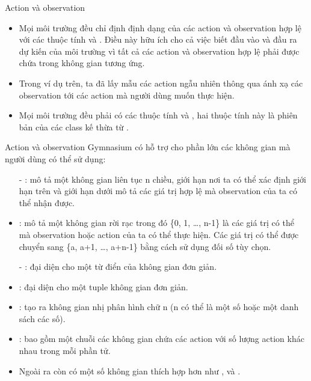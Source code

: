 \documentclass[10pt,aspectratio=169]{beamer}
\begin{document}
\begin{frame}{Action và observation}{\subsecname}
\begin{itemize}
\setlength\itemsep{8pt}
\item Mọi môi trường đều chỉ định định dạng của các action và observation hợp lệ với các thuộc tính  và . Điều này hữu ích cho cả việc biết đầu vào và đầu ra dự kiến của môi trường vì tất cả các action và observation hợp lệ phải được chứa trong không gian tương ứng.
\item Trong ví dụ trên, ta đã lấy mẫu các action ngẫu nhiên thông qua  ánh xạ các observation tới các action mà người dùng muốn thực hiện. 
\item Mọi môi trường đều phải có các thuộc tính  và , hai thuộc tính này là phiên bản của các class kế thừa từ .
\end{itemize}
\end{frame}

\begin{frame}{Action và observation}{\subsecname}
Gymnasium có hỗ trợ cho phần lớn các không gian mà người dùng có thể sử dụng:
\footnotesize
\begin{itemize}
\setlength\itemsep{4pt}
\item[-] : mô tả một không gian liên tục n chiều, giới hạn nơi ta có thể xác định giới hạn trên và giới hạn dưới mô tả các giá trị hợp lệ mà observation của ta có thể nhận được.
\item[-] : mô tả một không gian rời rạc trong đó \{0, 1, …, n-1\} là các giá trị có thể mà observation hoặc action của ta có thể thực hiện. Các giá trị có thể được chuyển sang \{a, a+1, …, a+n-1\} bằng cách sử dụng đối số tùy chọn.
\item[-] : đại diện cho một từ điển của không gian đơn giản.
\item[-] : đại diện cho một tuple không gian đơn giản.
\item[-] : tạo ra không gian nhị phân hình chữ n (n có thể là một số hoặc một danh sách các số).
\item[-] : bao gồm một chuỗi các không gian chứa các action  với số lượng action khác nhau trong mỗi phần tử.
\item[-] Ngoài ra còn có một số không gian thích hợp hơn như ,  và .
\end{itemize}
\end{frame}
\end{document}
